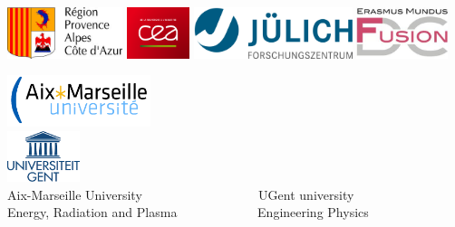 \begin{titlepage}

\begin{center}
\includegraphics[height=1.5cm]{logo_PACA.jpg} \hspace{+0.5cm}
\includegraphics[height=1.5cm]{logo_CEA.png} \hspace{+0.5cm}
\includegraphics[height=1.5cm]{logo_FZJ_court.png} \hspace{+0.5cm}
 \includegraphics[height=1.5cm]{logo_fusion_DC.jpg}
\vspace{0.6cm}






\hspace{+0.3cm}
\includegraphics[height=1.5cm]{logo_AMU.png}~~~~~~~~~~~~~~~~~~~~~~~~~~~~~~~~~~~~~~~~
\includegraphics[height=1.5cm]{logo_UGent.png} \\
\hspace{+0.4cm}
{\Large {Aix-Marseille University ~~~~~~~~~~~~~~~~~ UGent university}\\}
\vspace{0.1cm}
{\Large Energy, Radiation and Plasma ~~~~~~~~~~~~Engineering Physics}\\


\end{center}
\end{titlepage}
